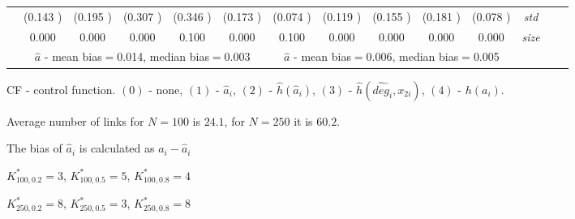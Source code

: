 \begin{table}
\begin{threeparttable}
{\begin{tabular}{|c|c|c|c|c|c|c|c|c|c|c|c|c|c|}
&(0.143 )&(0.195 )&(0.307 )&(0.346 )&(0.173 )&(0.074 )&(0.119 )&(0.155 )&(0.181 )&(0.078 )&\textit{std}\\ 
& 0.000 & 0.000 &0.000 &0.100 &0.000 &0.100& 0.000& 0.000 &0.000 &0.000 &\textit{size} \\\midrule 
&\multicolumn{5}{|c|}{$\hat{a}$ - mean bias$=$0.014, median bias$=$0.003 }&\multicolumn{5}{|c|}{$\hat{a}$ - mean bias$=$0.006, median bias$=$0.005 }&\\ \hline 
\end{tabular}} 
\begin{tablenotes}\tiny 
\item CF - control function. $(0)$ - none, $(1)$ - $\hat{a}_i$,  $(2)$ - $\hat{h}(\hat{a}_i)$, $(3)$ - $\hat{h}(\widehat{deg}_i,x_{2i})$, $(4)$ - $h(a_i)$. 
\item Average number of links for $N=100$ is $24.1$, for $N=250$ it is $60.2$. 
\item The bias of $\hat{a}_i$ is calculated as $a_i-\hat{a}_i$ 
\item $K^*_{100,0.2}=3$, $K^*_{100,0.5}=5$, $K^*_{100,0.8}=4$ 
\item $K^*_{250,0.2}=8$, $K^*_{250,0.5}=3$, $K^*_{250,0.8}=8$ 
  \end{tablenotes} 
\end{threeparttable} 
\end{table} 

